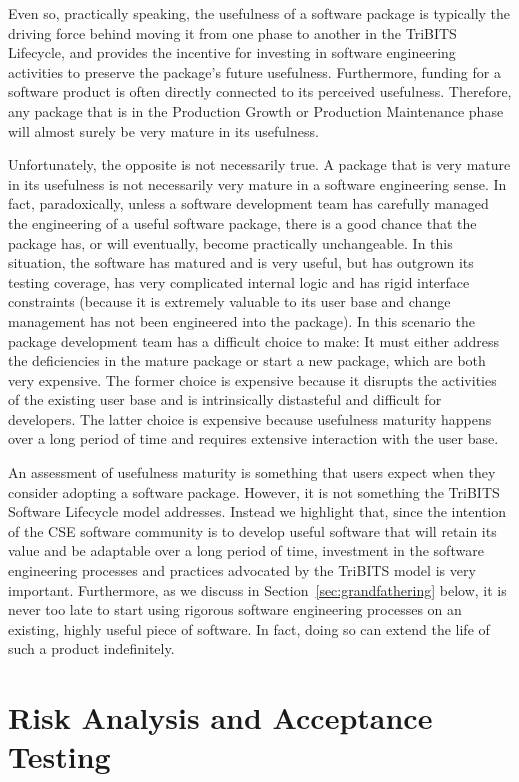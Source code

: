 \documentclass[11pt]{SANDreport}
\begin{document}
Even so, practically speaking, the usefulness of a software package is
typically the driving force behind moving it from one phase to another
in the TriBITS Lifecycle, and provides the incentive for investing in
software engineering activities to preserve the package's future
usefulness.  Furthermore, funding for a software product is often
directly connected to its perceived usefulness.  Therefore, any
package that is in the Production Growth or Production Maintenance
phase will almost surely be very mature in its usefulness.

Unfortunately, the opposite is not necessarily true.  A package that
is very mature in its usefulness is not necessarily very mature in a
software engineering sense.  In fact, paradoxically, unless a software
development team has carefully managed the engineering of a useful
software package, there is a good chance that the package has, or will
eventually, become practically unchangeable.  In this situation, the
software has matured and is very useful, but has outgrown its testing
coverage, has very complicated internal logic and has rigid interface
constraints (because it is extremely valuable to its user base and
change management has not been engineered into the package).  In this
scenario the package development team has a difficult choice to make:
It must either address the deficiencies in the mature package or start
a new package, which are both very expensive.  The former choice is
expensive because it disrupts the activities of the existing user base
and is intrinsically distasteful and difficult for developers.  The
latter choice is expensive because usefulness maturity happens over a
long period of time and requires extensive interaction with the user
base.

An assessment of usefulness maturity is something that users expect
when they consider adopting a software package.  However, it is not
something the TriBITS Software Lifecycle model addresses.  Instead we
highlight that, since the intention of the CSE software community is
to develop useful software that will retain its value and be adaptable
over a long period of time, investment in the software engineering
processes and practices advocated by the TriBITS model is very
important.  Furthermore, as we discuss in
Section~\ref{sec:grandfathering} below, it is never too late to start
using rigorous software engineering processes on an existing, highly
useful piece of software.  In fact, doing so can extend the life of
such a product indefinitely.

%
{}\section{Risk Analysis and Acceptance Testing}
\label{sec:risk_analysis_acceptance_testing}
%
\end{document}

